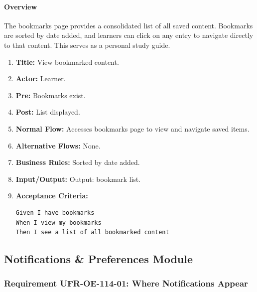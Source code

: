 \paragraph{Overview}
The bookmarks page provides a consolidated list of all saved content. Bookmarks are sorted by date added, and learners can click on any entry to navigate directly to that content. This serves as a personal study guide.
\begin{enumerate}[label=\textbf{\arabic*.}]
\item \textbf{Title:} View bookmarked content.
\item \textbf{Actor:} Learner.
\item \textbf{Pre:} Bookmarks exist.
\item \textbf{Post:} List displayed.
\item \textbf{Normal Flow:} Accesses bookmarks page to view and navigate saved items.
\item \textbf{Alternative Flows:} None.
\item \textbf{Business Rules:} Sorted by date added.
\item \textbf{Input/Output:} Output: bookmark list.
\item \textbf{Acceptance Criteria:}
    \begin{verbatim}
Given I have bookmarks
When I view my bookmarks
Then I see a list of all bookmarked content
    \end{verbatim}
\end{enumerate}

\subsection{Notifications \& Preferences Module}
\subsubsection{Requirement UFR-OE-114-01: Where Notifications Appear}
